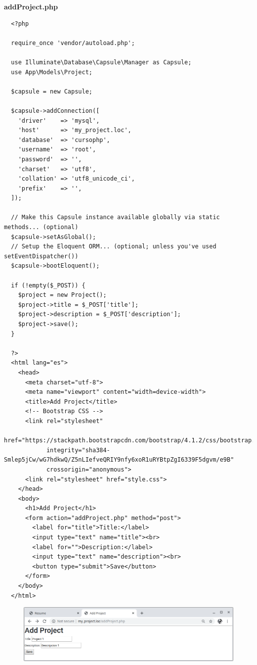 \documentclass{article}
\begin{document}
\textbf{addProject.php}
\begin{verbatim}
  <?php

  require_once 'vendor/autoload.php';

  use Illuminate\Database\Capsule\Manager as Capsule;
  use App\Models\Project;

  $capsule = new Capsule;

  $capsule->addConnection([
    'driver'    => 'mysql',
    'host'      => 'my_project.loc',
    'database'  => 'cursophp',
    'username'  => 'root',
    'password'  => '',
    'charset'   => 'utf8',
    'collation' => 'utf8_unicode_ci',
    'prefix'    => '',
  ]);

  // Make this Capsule instance available globally via static methods... (optional)
  $capsule->setAsGlobal();
  // Setup the Eloquent ORM... (optional; unless you've used setEventDispatcher())
  $capsule->bootEloquent();

  if (!empty($_POST)) {
    $project = new Project();
    $project->title = $_POST['title'];
    $project->description = $_POST['description'];
    $project->save();
  }

  ?>
  <html lang="es">
    <head>
      <meta charset="utf-8">
      <meta name="viewport" content="width=device-width">
      <title>Add Project</title>
      <!-- Bootstrap CSS -->
      <link rel="stylesheet"
            href="https://stackpath.bootstrapcdn.com/bootstrap/4.1.2/css/bootstrap.min.css"
            integrity="sha384-Smlep5jCw/wG7hdkwQ/Z5nLIefveQRIY9nfy6xoR1uRYBtpZgI6339F5dgvm/e9B"
            crossorigin="anonymous">
      <link rel="stylesheet" href="style.css">
    </head>
    <body>
      <h1>Add Project</h1>
      <form action="addProject.php" method="post">
        <label for="title">Title:</label>
        <input type="text" name="title"><br>
        <label for="">Description:</label>
        <input type="text" name="description"><br>
        <button type="submit">Save</button>
      </form>
    </body>
  </html>
\end{verbatim}

\begin{figure}[h!]
  \centering
  \includegraphics[scale=0.5]{./Pictures/096_form_func.png}
\end{figure}
\end{document}
